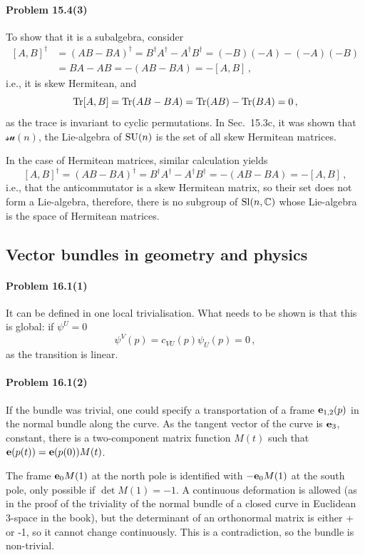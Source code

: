 \documentclass[a4paper,12pt]{article}
\def\Tr{\ensuremath{\mathop{\rm Tr}}}
\newcommand{\problem}[1]{\paragraph{Problem #1}}
\begin{document}

\problem{15.4(3)} To show that it is a subalgebra, consider
\[
\begin{aligned}{}
 [A, B]^\dagger &= (AB-BA)^\dagger = B^\dagger A^\dagger - A^\dagger B^\dagger = (-B)(-A)-(-A)(-B)\\
 &= BA-AB = -(AB-BA) = -[A, B]\,,
\end{aligned}
\]
i.e., it is skew Hermitean, and
\[
 \Tr [A, B] = \Tr(AB-BA) = \Tr(AB) - \Tr(BA) = 0\,,
\]
as the trace is invariant to cyclic permutations. In Sec.\ 15.3c, it was shown that $\mathcal{su}(n)$, the Lie-algebra of ${\rm SU}(n)$ is the set of all skew Hermitean matrices.

In the case of Hermitean matrices, similar calculation yields
\[
 [A, B]^\dagger = (AB-BA)^\dagger = B^\dagger A^\dagger - A^\dagger B^\dagger = -(AB-BA) = -[A, B]\,,
\]
i.e., that the anticommutator is a skew Hermitean matrix, so their set does not form a Lie-algebra, therefore, there is no subgroup of ${\rm Sl}(n, \mathbb{C})$ whose Lie-algebra is the space of Hermitean matrices.



\subsection{Vector bundles in geometry and physics}



\problem{16.1(1)} It can be defined in one local trivialisation. What needs to be shown is that this is global: if $\psi^U = 0$
\[
 \psi^V(p) = c_{VU}(p) \psi_U(p) = 0\,,
\]
as the transition is linear.


\problem{16.1(2)} If the bundle was trivial, one could specify a transportation of a frame ${\bf e}_{1,2}(p)$ in the normal bundle along the curve. As the tangent vector of the curve is ${\bf e}_3$, constant, there is a two-component matrix function $M(t)$ such that ${\bf e}(p(t)) = {\bf e}(p(0)) M(t)$.

The frame ${\bf e}_0 M(1)$ at the north pole is identified with $-{\bf e}_0 M(1)$ at the south pole, only possible if $\det M(1)=-1$. A continuous deformation is allowed (as in the proof of the triviality of the normal bundle of a closed curve in Euclidean 3-space in the book), but the determinant of an orthonormal matrix is either + or -1, so it cannot change continuously. This is a contradiction, so the bundle is non-trivial.
\end{document}
